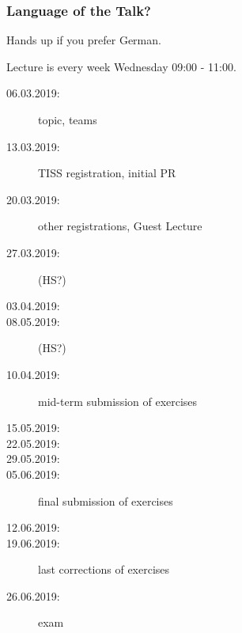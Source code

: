 

\date{13.3.2018}



\renewcommand{\enquote}[1]{\emph{``#1''}} %

\begin{frame}
	\titlepage
	\doclicenseThis
\end{frame}

\begin{assignment}
	\frametitle{Language of the Talk?}
	\begin{task}
	Hands up if you prefer German.
	\end{task}
\end{assignment}

\begin{frame}
	Lecture is every week Wednesday 09:00 - 11:00.

	\begin{description}
		\item[06.03.2019:] topic, teams
		\item[13.03.2019:] {\color{red}TISS registration, initial PR}
		\item[20.03.2019:] other registrations, Guest Lecture
		\item[27.03.2019:] (HS?)
		\item[03.04.2019:]
		\item[08.05.2019:] (HS?)
		\item[10.04.2019:] mid-term submission of exercises
		\item[15.05.2019:]
		\item[22.05.2019:]
		\item[29.05.2019:]
		\item[05.06.2019:] final submission of exercises
		\item[12.06.2019:]
		\item[19.06.2019:] last corrections of exercises
		\item[26.06.2019:] exam
	\end{description}
\end{frame}

